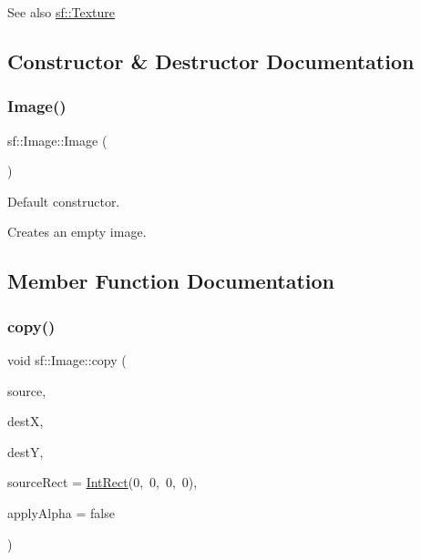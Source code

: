 \begin{DoxySeeAlso}{See also}
\hyperlink{classsf_1_1_texture}{sf\+::\+Texture} 
\end{DoxySeeAlso}


\subsection{Constructor \& Destructor Documentation}
\mbox{\label{classsf_1_1_image_abb4caf3cb167b613345ebe36fc883f12}} 
\subsubsection{\texorpdfstring{Image()}{Image()}}
{\footnotesize\ttfamily sf\+::\+Image\+::\+Image (\begin{DoxyParamCaption}{ }\end{DoxyParamCaption})}



Default constructor. 

Creates an empty image. 

\subsection{Member Function Documentation}
\mbox{\label{classsf_1_1_image_ab2fa337c956f85f93377dcb52153a45a}} 
\subsubsection{\texorpdfstring{copy()}{copy()}}
{\footnotesize\ttfamily void sf\+::\+Image\+::copy (\begin{DoxyParamCaption}\item[{const \hyperlink{classsf_1_1_image}{Image} \&}]{source,  }\item[{unsigned int}]{destX,  }\item[{unsigned int}]{destY,  }\item[{const \hyperlink{classsf_1_1_rect}{Int\+Rect} \&}]{source\+Rect = {\ttfamily \hyperlink{classsf_1_1_rect}{Int\+Rect}(0,~0,~0,~0)},  }\item[{bool}]{apply\+Alpha = {\ttfamily false} }\end{DoxyParamCaption})}



